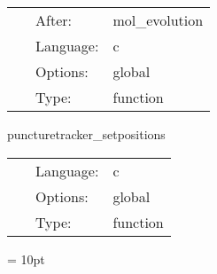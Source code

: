 \hspace{5mm}

 \begin{tabular*}{160mm}{cll} 
~ & After:  & mol\_evolution \\ 
~ & Language:  & c \\ 
~ & Options:  & global \\ 
~ & Type:  & function \\ 
\end{tabular*} 


\vspace{5mm}


\hspace{5mm} puncturetracker\_setpositions 

\hspace{5mm}{\it copy puncture positions to spherical surfaces } 


\hspace{5mm}

 \begin{tabular*}{160mm}{cll} 
~ & Language:  & c \\ 
~ & Options:  & global \\ 
~ & Type:  & function \\ 
\end{tabular*} 



\vspace{5mm}\parskip = 10pt 

